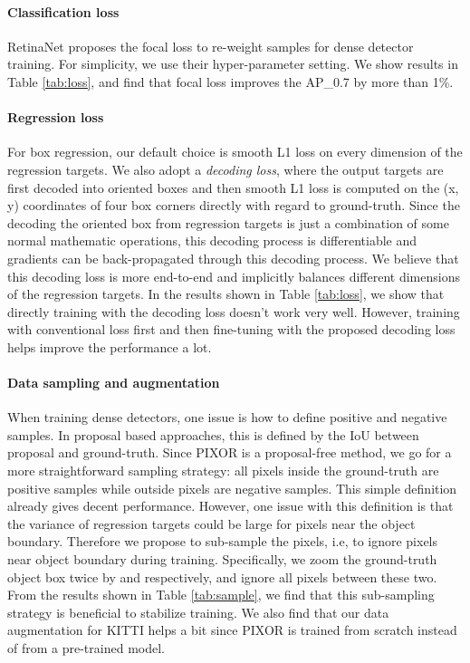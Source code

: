 \vspace{-0.2cm}
\paragraph{Classification loss} RetinaNet \cite{focal} proposes the focal loss to re-weight samples for dense detector training. For simplicity, we use their hyper-parameter setting. We show results in Table \ref{tab:loss}, and find that focal loss improves the AP\_0.7 by more than 1\%.

\vspace{-0.2cm}
\paragraph{Regression loss} For box regression, our default choice is smooth L1 loss \cite{frcn} on every dimension of the regression targets. We also adopt a {\it decoding loss}, where the output targets are first decoded into oriented boxes and then smooth L1 loss is computed on the (x, y) coordinates of four box corners directly with regard to ground-truth. Since the decoding the oriented box from regression targets is just a combination of some normal mathematic operations, this decoding process is differentiable and gradients can be back-propagated through this decoding process. We believe that this decoding loss is more end-to-end and implicitly balances different dimensions of the regression targets. In the results shown in Table \ref{tab:loss}, we show that directly training with the decoding loss doesn't work very well. However, training with conventional loss first and then fine-tuning with the proposed decoding loss helps improve the performance a lot.

\vspace{-0.2cm}
\paragraph{Data sampling and augmentation} 
When training dense detectors, one issue is how to define positive and negative samples. In proposal based approaches, this is defined by the IoU between proposal and ground-truth. Since PIXOR is a proposal-free method, we go for a more straightforward sampling strategy: all pixels inside the ground-truth are positive samples while outside pixels are negative samples. This simple definition already gives decent performance. However, one issue with this definition is that the variance of regression targets could be large for pixels near the object boundary. Therefore we propose to sub-sample the pixels, i.e, to ignore pixels near object boundary during training. Specifically, we zoom the ground-truth object box twice by  and  respectively, and ignore all pixels between these two. From the results shown in Table \ref{tab:sample}, we find that this sub-sampling strategy is beneficial to stabilize training. We also find that our data augmentation for KITTI helps a bit since PIXOR is trained from scratch instead of from a pre-trained model.

